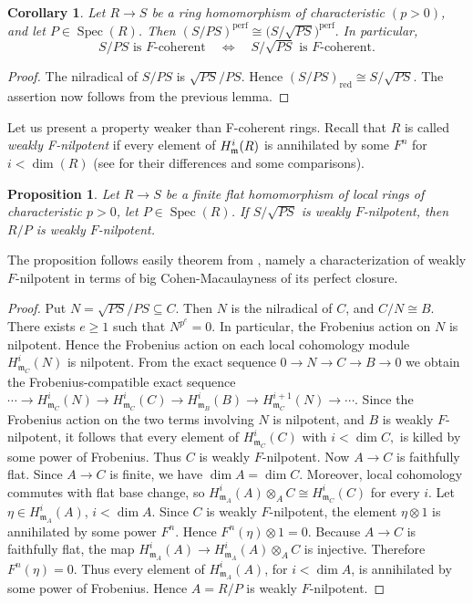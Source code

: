 \documentclass[10pt,a4paper]{amsart}
\newtheorem{proposition}[theorem]{Proposition}
\newtheorem{corollary}[theorem]{Corollary}
\theoremstyle{definition}
\theoremstyle{remark}
\newcommand{\fm}{\frak{m}}
\begin{document}
\begin{corollary}
	Let \(R\to S\) be a ring homomorphism of characteristic $(p>0)$, and let
	\(P\in\operatorname{Spec}(R)\). Then
	$
	(S/PS)^{\mathrm{perf}}
	\cong
	\bigl(S/\sqrt{PS}\bigr)^{\mathrm{perf}}.
	$
	In particular,
	\[
	S/PS\text{ is $F$-coherent}
	\quad\Longleftrightarrow\quad
	S/\sqrt{PS}\text{ is $F$-coherent}.
	\]
\end{corollary}

\begin{proof}
	The nilradical of \(S/PS\) is
	$
	\sqrt{PS}/PS.
	$
	Hence
	$
	(S/PS)_{\mathrm{red}}
	\cong S/\sqrt{PS}.
	$
	The assertion now follows from the previous lemma.
\end{proof}



 
Let us present a property weaker than F-coherent rings. Recall  that $R$ is called \emph{weakly F-nilpotent}  if  every element of $H^i_\fm(R)$ is annihilated by some   $F^n$ for
$i < \dim(R)$  (see \cite{A} for their differences and some comparisons). 
\begin{proposition}\label{212}
	Let \(R\to S\) be a finite  flat homomorphism of
	local rings of characteristic \(p>0\), let
	\(P\in\operatorname{Spec}(R)\).
 If \(S/\sqrt{PS}\) is weakly
	\(F\)-nilpotent, then \(R/P\) is weakly \(F\)-nilpotent.
\end{proposition}
The proposition  follows easily 
theorem from \cite[Proposition 12.22]{MP}, 
 namely a characterization of weakly \(F\)-nilpotent in terms of big Cohen-Macaulayness of its perfect closure. 
 
\begin{proof}
 Put
$
	N=\sqrt{PS}/PS\subseteq C.
	$ Then \(N\) is the nilradical of \(C\), and
$
	C/N\cong B.
$
There exists \(e\geq 1\) such that
$
	N^{p^e}=0.
	$	In particular, the Frobenius action on \(N\) is nilpotent. Hence the
	Frobenius action on each local cohomology module
	\(H^i_{\mathfrak m_C}(N)\) is nilpotent.
	From the exact sequence
$
	0\to N\to C\to B
	\to0
	$ we obtain the Frobenius-compatible exact sequence
 $
	\cdots\to
	H^i_{\mathfrak m_C}(N)
\to
	H^i_{\mathfrak m_C}(C)
\to
	H^i_{\mathfrak m_B}(B)
\to
	H^{i+1}_{\mathfrak m_C}(N)
\to\cdots .
	$ 
	Since the Frobenius action on the two terms involving \(N\) is
	nilpotent, and \(B\) is weakly \(F\)-nilpotent, it follows that
	every element of
$
	H^i_{\mathfrak m_C}(C)$ with $ i<\dim C,
$
	is killed by some power of Frobenius. Thus \(C\) is weakly
	\(F\)-nilpotent.
Now \(A\to C\) is faithfully flat. Since \(A\to C\) is finite,
	we have
$
	\dim A=\dim C.
$	Moreover, local cohomology commutes with flat base change, so
$
	H^i_{\mathfrak m_A}(A)\otimes_A C
	\cong
	H^i_{\mathfrak m_C}(C)
	$
for every \(i\). Let
$
	\eta\in H^i_{\mathfrak m_A}(A)$, $i<\dim A.
	$ Since \(C\) is weakly \(F\)-nilpotent, the element
	\(\eta\otimes1\) is annihilated by some power \(F^n\). Hence
$
	F^n(\eta)\otimes1=0.
$
Because \(A\to C\) is faithfully flat, the map
$
	H^i_{\mathfrak m_A}(A)
	\to
	H^i_{\mathfrak m_A}(A)\otimes_A C
	$ is injective. Therefore
$
	F^n(\eta)=0.
	$ Thus every element of \(H^i_{\mathfrak m_A}(A)\), for
	\(i<\dim A\), is annihilated by some power of Frobenius. Hence
	\(A=R/P\) is weakly \(F\)-nilpotent.
\end{proof}
\end{document}
